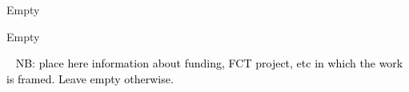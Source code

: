 \documentclass[
  oneside,
  11pt, a4paper,
  footinclude=true,
  headinclude=true,
  cleardoublepage=empty
]{scrbook}
\begin{document}
Empty

Empty

\cleardoublepage



\printindex

    
    \appendix
    \renewcommand\chaptername{Appendix}














\begin{backcover}
\thispagestyle{empty} \pagecolor{white} \textcolor{black} {\selectfont ~\vfill
\noindent
NB: place here information about funding, FCT project, etc in which the work is framed. Leave empty otherwise.
%
\vfill ~}
\end{backcover}
\end{document}
